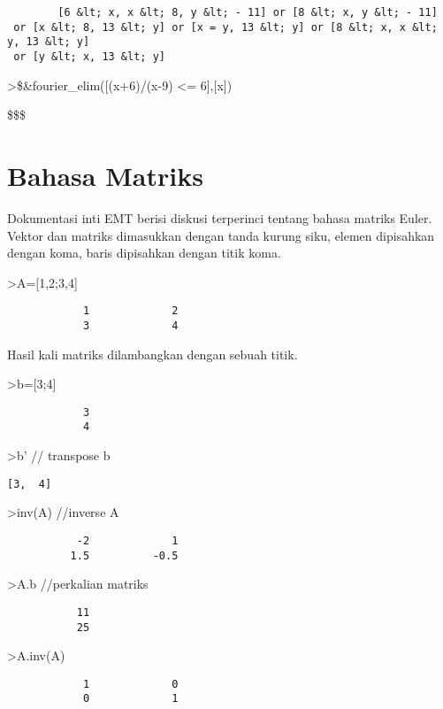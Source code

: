 \documentclass[
]{book}
\begin{document}
\begin{verbatim}
        [6 &lt; x, x &lt; 8, y &lt; - 11] or [8 &lt; x, y &lt; - 11]
 or [x &lt; 8, 13 &lt; y] or [x = y, 13 &lt; y] or [8 &lt; x, x &lt; y, 13 &lt; y]
 or [y &lt; x, 13 &lt; y]    
\end{verbatim}

\textgreater\$\&fourier\_elim({[}(x+6)/(x-9) \textless= 6{]},{[}x{]})

\$\left[ x=12 \right] \lor \left[ 12<x \right] \lor \left[ x<9   \right] \$\$

\chapter{Bahasa Matriks}\label{bahasa-matriks}

Dokumentasi inti EMT berisi diskusi terperinci tentang bahasa matriks Euler. Vektor dan matriks dimasukkan dengan tanda kurung siku, elemen dipisahkan dengan koma, baris dipisahkan dengan titik koma.

\textgreater A={[}1,2;3,4{]}

\begin{verbatim}
            1             2 
            3             4 
\end{verbatim}

Hasil kali matriks dilambangkan dengan sebuah titik.

\textgreater b={[}3;4{]}

\begin{verbatim}
            3 
            4 
\end{verbatim}

\textgreater b' // transpose b

\begin{verbatim}
[3,  4]
\end{verbatim}

\textgreater inv(A) //inverse A

\begin{verbatim}
           -2             1 
          1.5          -0.5 
\end{verbatim}

\textgreater A.b //perkalian matriks

\begin{verbatim}
           11 
           25 
\end{verbatim}

\textgreater A.inv(A)

\begin{verbatim}
            1             0 
            0             1 
\end{verbatim}
\end{document}
